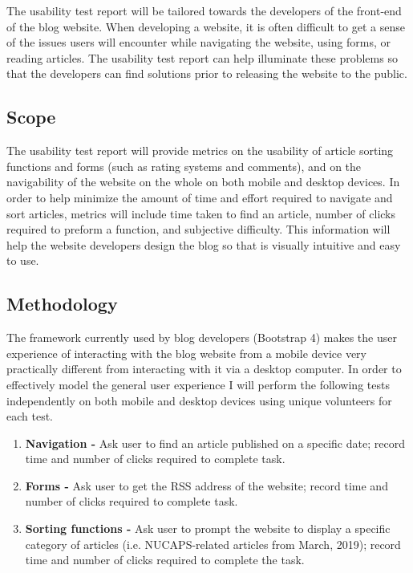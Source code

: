 \documentclass[12pt]{article}
\begin{document}
The usability test report will be tailored towards the developers of the front-end of the blog website. When developing a website, it is often difficult to get a sense of the issues users will encounter while navigating the website, using forms, or reading articles. The usability test report can help illuminate these problems so that the developers can find solutions prior to releasing the website to the public.

\subsection{Scope}

The usability test report will provide metrics on the usability of article sorting functions and forms (such as rating systems and comments), and on the navigability of the website on the whole on both mobile and desktop devices. In order to help minimize the amount of time and effort required to navigate and sort articles, metrics will include time taken to find an article, number of clicks required to preform a function, and subjective difficulty. This information will help the website developers design the blog so that is visually intuitive and easy to use.

\subsection{Methodology}

The framework currently used by blog developers (Bootstrap 4) makes the user experience of interacting with the blog website from a mobile device very practically different from interacting with it via a desktop computer. In order to effectively model the general user experience I will perform the following tests independently on both mobile and desktop devices using unique volunteers for each test.

\begin{enumerate}
	\item{\textbf{Navigation -} Ask user to find an article published on a specific date; record time and number of clicks required to complete task.}
	\item{\textbf{Forms -}  Ask user to get the RSS address of the website; record time and number of clicks required to complete task.}
	\item{\textbf{Sorting functions -} Ask user to prompt the website to display a specific category of articles (i.e. NUCAPS-related articles from March, 2019); record time and number of clicks required to complete the task.}
\end{enumerate}
\end{document}
